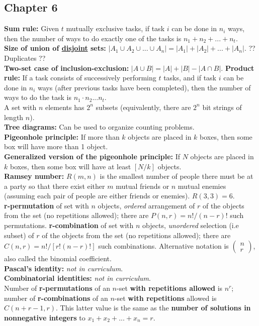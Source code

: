 \documentclass[12pt]{article}
\begin{document}
\subsection{Chapter 6}
\textbf{Sum rule:} Given $t$ mutually exclusive tasks, if task $i$ can be done in $n_i$ ways, then the number of ways to do exactly one of the tasks is $n_1 + n_2 + ... + n_t$.\\
\textbf{Size of union of \underline{disjoint} sets:} $|A_1 \cup A_2 \cup ... \cup A_n | = |A_1| + |A_2| + ... + |A_n|$. ?? Duplicates ??\\
\textbf{Two-set case of inclusion-exclusion:} $|A \cup B| = |A| + |B| - |A \cap B|$.
\textbf{Product rule:} If a task consists of successively performing $t$ tasks, and if task $i$ can be done in $n_i$ ways (after previous tasks have been completed), then the number of ways to do the task is $n_1 \cdot n_2 ... n_t$. \\
A set with $n$ elements has $2^n$ subsets (equivalently, there are $2^n$ bit strings of length $n$). \\
\textbf{Tree diagrams:} Can be used to organize counting problems. \\
\textbf{Pigeonhole principle:} If more than $k$ objects are placed in $k$ boxes, then some box will have more than 1 object.\\
\textbf{Generalized version of the pigeonhole principle:} If $N$ objects are placed in $k$ boxes, then some box will have at least $[N/k]$ objects. \\
\textbf{Ramsey number:} $R(m,n)$ is the smallest number of people there must be at a party so that there exist either $m$ mutual friends or $n$ mutual enemies (assuming each pair of people are either friends or enemies). $R(3,3) = 6$. \\
\textbf{r-permutation} of set with $n$ objects, \textit{ordered} arrangement of $r$ of the objects from the set (no repetitions allowed); there are $P(n,r) = n!/(n-r)!$ such permutations.
\textbf{r-combination} of set with $n$ objects, \textit{unordered} selection (i.e subset) of $r$ of the objects from the set (no repetitions allowed); there are $C(n,r) = n!/[r!(n-r)!]$ such combinations. Alternative notation is $\begin{pmatrix} n \\ r\end{pmatrix}$, also called the binomial coefficient. \\
\textbf{Pascal's identity:} \textit{not in curriculum}. \\
\textbf{Combinatorial identities:} \textit{not in curriculum}. \\
Number of \textbf{r-permutations} of an $n$-set \textbf{with repetitions allowed} is $n^r$; number of \textbf{r-combinations} of an $n$-set \textbf{with repetitions} allowed is $C(n +r - 1,r)$. This latter value is the same as the \textbf{number of solutions in nonnegative integers} to $x_1 + x_2 + ... + x_n =r $. \\
\newpage
\end{document}
